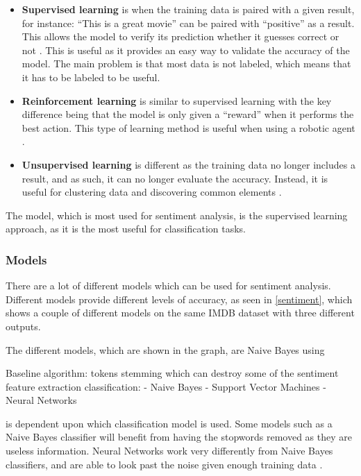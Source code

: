 \begin{itemize}
  \item \textbf{Supervised learning} is when the training data is paired with a
  given result, for instance: ``This is a great movie'' can be paired with
  ``positive'' as a result. This allows the model to verify its prediction
  whether it guesses correct or not \citep[Ch. 7 Overview]{MIBook}. This is
  useful as it provides an easy way to validate the accuracy of the model. The main problem
  is that most data is not labeled, which means that it has to be labeled to be
  useful.
  \item \textbf{Reinforcement learning} is similar to supervised learning with
  the key difference being that the model is only given a ``reward'' when it
  performs the best action. This type of learning method is useful when
  using a robotic agent \citep{Reinforcement}.
  \item \textbf{Unsupervised learning} is different as the training data no
  longer includes a result, and as such, it can no longer evaluate the accuracy.
  Instead, it is useful for clustering data and discovering common elements
  \citep[Ch. 11.1 Overview]{MIBook}.
\end{itemize}

The model, which is most used for sentiment analysis, is the supervised learning
approach, as it is the most useful for classification tasks.

\subsubsection{Models}\label{subsub:Models}

There are a lot of different models which can be used for sentiment analysis. 
Different models provide different levels of accuracy, as seen in
\autoref{sentiment}, which shows a couple of different models on the same IMDB
dataset with three different outputs\citep{Classification}.


The different models, which are shown in the graph, are Naive Bayes using 

Baseline algorithm:
tokens
stemming which can destroy some of the sentiment
feature extraction
classification:
- Naive Bayes
- Support Vector Machines
- Neural Networks



 is dependent upon which classification model is used. Some models
such as a Naive Bayes classifier will benefit from having the stopwords removed
as they are useless information. Neural Networks work very differently from
Naive Bayes classifiers, and are able to look past the noise given enough
training data \Source.\nl